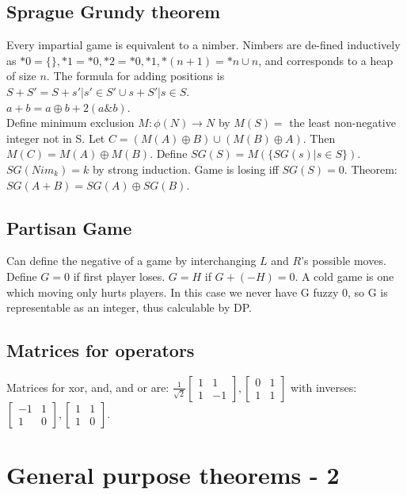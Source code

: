     \subsection{Sprague Grundy theorem}
    Every impartial game is equivalent to a nimber. Nimbers are de-fined inductively as $*0 = \{\}, *1 = {*0}, *2 = {*0, *1}, *(n+1) = *n \cup {n}$, and
    corresponds to a heap of size $n$. The formula for adding positions is $S + S' = {S + s' | s' \in S'} \cup {s + S' | s \in S}$.\\
    $a + b = a \oplus b + 2(a\&b)$.\\
    Define minimum exclusion $M : \phi(N) \rightarrow N$ by $M(S) = $ the least non-negative integer not in S.
    Let $C = (M(A) \oplus B) \cup (M(B) \oplus A)$. Then $M(C) = M(A) \oplus M(B)$.
    Define $SG(S) = M (\{SG(s) | s \in S\})$.
    $SG(Nim_k) = k$ by strong induction. Game is losing iff $SG(S) = 0$. Theorem: $SG(A + B) = SG(A) \oplus SG(B)$.

    \subsection{Partisan Game}
    Can define the negative of a game by interchanging $L$ and $R$'s possible moves.
    Define $G = 0$ if first player loses. $G = H$ if $G + (-H) = 0$.
    A cold game is one which moving only hurts players. In this case we never have G fuzzy 0, so G is
    representable as an integer, thus calculable by DP.

    \subsection{Matrices for operators}
    Matrices for xor, and, and or are: $\frac{1}{\sqrt{2}} \begin{bmatrix} 1 & 1 \\ 1 & -1\end{bmatrix}, \begin{bmatrix} 0 & 1 \\ 1 & 1\end{bmatrix}$
    with inverses: $\begin{bmatrix} -1 & 1 \\ 1 & 0\end{bmatrix}, \begin{bmatrix} 1 & 1 \\ 1 & 0\end{bmatrix}$.
    
 \section{General purpose theorems - 2}

